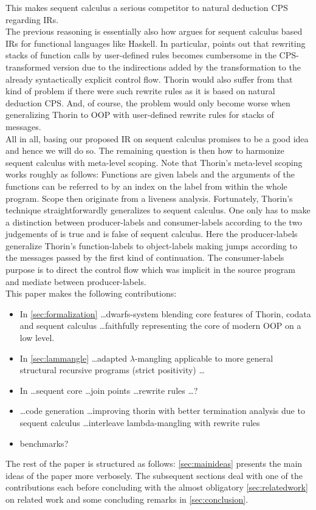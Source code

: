 This makes sequent calculus a serious competitor to natural deduction CPS regarding IRs.
\\
The previous reasoning is essentially also how \cite{seqcore} argues for sequent calculus based IRs for functional languages like Haskell.
In particular, \cite{seqcore} points out that rewriting stacks of function calls by user-defined rules becomes cumbersome in the CPS-transformed version due to the indirections added by the transformation to the already syntactically explicit control flow.
Thorin would also suffer from that kind of problem if there were such rewrite rules as it is based on natural deduction CPS.
And, of course, the problem would only become worse when generalizing Thorin to OOP with user-defined rewrite rules for stacks of messages.
\\
All in all, basing our proposed IR on sequent calculus promises to be a good idea and hence we will do so.
The remaining question is then how to harmonize sequent calculus with meta-level scoping.
Note that Thorin's meta-level scoping works roughly as follows:
Functions are given labels and the arguments of the functions can be referred to by an index on the label from within the whole program.
Scope then originate from a liveness analysis.
Fortunately, Thorin's technique straightforwardly generalizes to sequent calculus.
One only has to make a distinction between producer-labels and consumer-labels according to the two judgements of {\glqq}is true{\grqq} and {\glqq}is false{\grqq} of sequent calculus.
Here the producer-labels generalize Thorin's function-labels to object-labels making jumps according to the messages passed by the first kind of continuation.
The consumer-labels purpose is to direct the control flow which was implicit in the source program and mediate between producer-labels.
\\
This paper makes the following contributions:
\begin{itemize}
  \item
    In \cref{sec:formalization} \ldots dwarfs-system blending core features of Thorin, codata and sequent calculus \ldots faithfully representing the core of modern OOP on a low level.
  \item
    In \cref{sec:lammangle} \ldots adapted $\lambda$-mangling applicable to more general structural recursive programs (strict positivity) \ldots
  \item
    In \ldots sequent core \ldots join points \ldots rewrite rules \ldots?
  \item
    \ldots code generation \ldots improving thorin with better termination analysis due to sequent calculus \ldots interleave lambda-mangling with rewrite rules
  \item
    benchmarks?
\end{itemize}
The rest of the paper is structured as follows: \cref{sec:mainideas} presents the main ideas of the paper more verbosely. The subsequent sections deal with one of the contributions each before concluding with the almost obligatory \cref{sec:relatedwork} on related work and some concluding remarks in \cref{sec:conclusion}.

